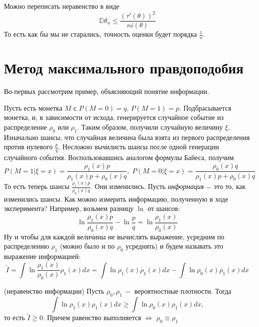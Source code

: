 \begin{remark}
Можно переписать неравенство в виде
\[
    \mathbb{D} \theta_n \leq \frac{\left(\tau'\left(\theta\right)\right) ^ 2}{n i\left(\theta\right)}
\]
То есть как бы мы не старались, точность оценки будет порядка $\frac 1 n$.
\end{remark}

\clearpage
\section{Метод максимального правдоподобия}
Во-первых рассмотрим пример, объясняющий понятие информации.
\begin{example}
Пусть есть монетка $M$ с $P\left(M = 0\right) = q$, $P\left(M = 1\right) = p$. Подбрасывается монетка, и, в зависимости от исхода, генерируется случайное событие из распределение $\rho_0$ или $\rho_1$. Таким образом, получили случайную величину $\xi$. Изначально шансы, что случайная величина была взята из первого распределения против нулевого $\frac p q$. Несложно вычилисть шансы после одной генерации случайного события. Воспользовавшись аналогом формулы Байеса, получим
\[
    P\left(M = 1 | \xi = x\right) = \frac{\rho_1\left(x\right)p}{\rho_1\left(x\right)p + \rho_0\left(x\right)q}, \; P\left(M = 0 | \xi = x\right) = \frac{\rho_0\left(x\right)q}{\rho_1\left(x\right)p + \rho_0\left(x\right)q}
\] 
То есть теперь шансы $\frac{\rho_1\left(x\right) p}{\rho_0\left(x\right) q}$. Они изменились. Пусть \textit{информация} $-$ это то, как изменились шансы. Как можно измерить информацию, полученную в ходе эксперимента? Например, возьмем разницу $\ln$ от шансов:
\[
    \ln \frac{\rho_1\left(x\right) p}{\rho_0\left(x\right) q} - \ln \frac p q= \ln \frac{\rho_1\left(x\right)}{\rho_0\left(x\right)}
\]
Ну и чтобы для каждой величины не вычислять выражение, усредним по распределению $\rho_1$ (можно было и по $\rho_0$ усреднять) и будем называть это выражение информацией: 
\[
    \tilde{I} = \int \ln \frac{\rho_1\left(x\right)}{\rho_0\left(x\right)} \rho_1\left(x\right) dx = \int \ln \rho_1\left(x\right) \rho_1\left(x\right) dx - \int \ln \rho_0\left(x\right) \rho_1\left(x\right) dx
\]
\end{example}
\begin{statement} (неравенство информации)
Пусть $\rho_0, \rho_1 \ - $ вероятностные плотности. Тогда 
\[
    \int \ln \rho_1\left(x\right) \rho_1\left(x\right) dx \geq \int \ln \rho_0\left(x\right) \rho_1\left(x\right) dx,
\]
то есть $\tilde{I} \geq 0$. Причем равенство выполняется $\Leftrightarrow$ $\rho_0 \equiv \rho_1$
\end{statement}
